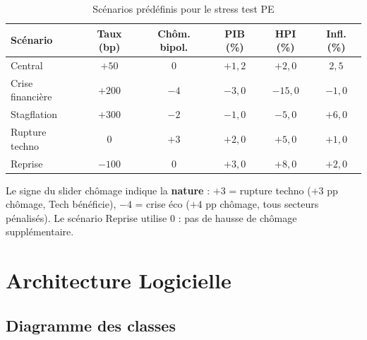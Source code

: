 \documentclass[12pt,a4paper]{article}
\begin{document}
\begin{table}[h]
\centering
\caption{Sc\'{e}narios pr\'{e}d\'{e}finis pour le stress test PE}
\label{tab:predefined}
\begin{tabular}{lccccc}
\toprule
\textbf{Sc\'{e}nario} & \textbf{Taux (bp)} & \textbf{Ch\^{o}m. bipol.} & \textbf{PIB (\%)} & \textbf{HPI (\%)} & \textbf{Infl. (\%)} \\
\midrule
Central         & $+50$   & $0$   & $+1{,}2$ & $+2{,}0$  & $2{,}5$ \\
Crise financi\`{e}re & $+200$  & $-4$  & $-3{,}0$ & $-15{,}0$ & $-1{,}0$ \\
Stagflation     & $+300$  & $-2$  & $-1{,}0$ & $-5{,}0$  & $+6{,}0$ \\
Rupture techno  & $0$     & $+3$  & $+2{,}0$ & $+5{,}0$  & $+1{,}0$ \\
Reprise         & $-100$  & $0$   & $+3{,}0$ & $+8{,}0$  & $+2{,}0$ \\
\bottomrule
\end{tabular}
\end{table}

\begin{interpretbox}
Le signe du slider ch\^{o}mage indique la \textbf{nature} :
$+3$ = rupture techno ($+3$ pp ch\^{o}mage, Tech b\'{e}n\'{e}ficie),
$-4$ = crise \'{e}co ($+4$ pp ch\^{o}mage, tous secteurs p\'{e}nalis\'{e}s).
Le sc\'{e}nario Reprise utilise $0$ : pas de hausse de ch\^{o}mage suppl\'{e}mentaire.
\end{interpretbox}


\section{Architecture Logicielle}
\label{sec:architecture}

\subsection{Diagramme des classes}
\end{document}
